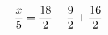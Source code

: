 \documentclass[preview]{standalone}
\begin{document}
\begin{align*}
\special{dvisvgm:raw <g id='unique000'>}- \frac{x}{5} = \frac{18}{2} - \frac{9}{2} + \frac{16}{2}\special{dvisvgm:raw </g>}
\end{align*}
\end{document}
